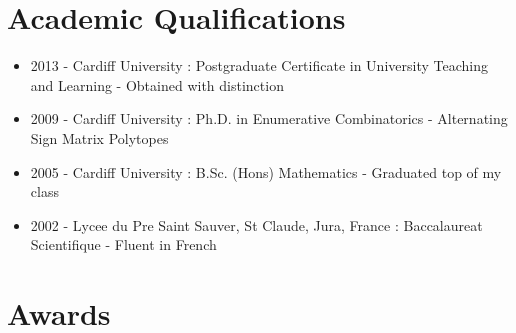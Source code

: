 \documentclass[10pt]{article}
\begin{document}
\section{Academic Qualifications}

\begin{itemize}

  \item 2013 - Cardiff University  : Postgraduate Certificate in University Teaching and Learning - Obtained with distinction

  \item 2009 - Cardiff University  : Ph.D. in Enumerative Combinatorics - Alternating Sign Matrix Polytopes

  \item 2005 - Cardiff University  : B.Sc. (Hons) Mathematics - Graduated top of my class

  \item 2002 - Lycee du Pre Saint Sauver, St Claude, Jura, France : Baccalaureat Scientifique - Fluent in French

\end{itemize}

\section{Awards}
\end{document}
